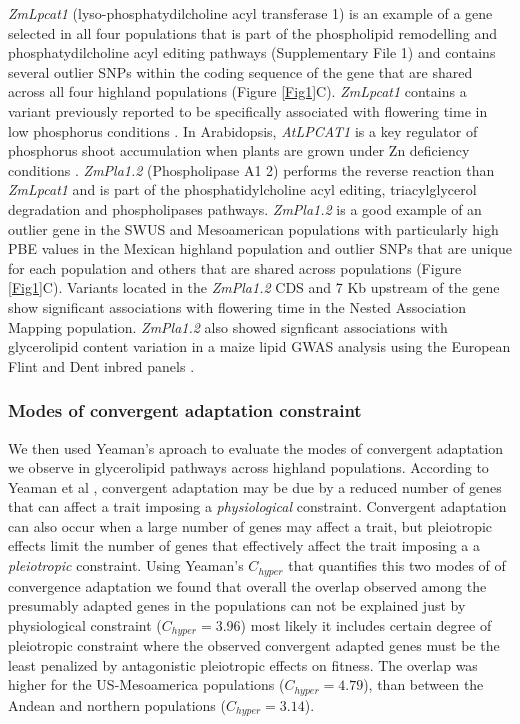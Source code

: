 \documentclass[9pt,twocolumn,twoside,lineno]{gsajnl}
\begin{document}
\textit{ZmLpcat1} (lyso-phosphatydilcholine acyl transferase 1) is an example of a gene selected in all four populations that is part of the phospholipid remodelling and phosphatydilcholine acyl editing pathways (Supplementary File 1) and contains several outlier SNPs within the coding sequence of the gene that are shared across all four highland populations (Figure \ref{Fig1}C). \textit{ZmLpcat1} contains a variant previously reported to be specifically associated with flowering time in low phosphorus conditions \cite{xu2018a}. 
In Arabidopsis, \textit{AtLPCAT1} is a key regulator of phosphorus shoot accumulation when plants are grown under Zn deficiency conditions \cite{Kisko2018-zm}.
\textit{ZmPla1.2} (Phospholipase A1 2) performs the reverse reaction than \textit{ZmLpcat1} and is part of the phosphatidylcholine acyl editing, triacylglycerol degradation and phospholipases pathways. 
\textit{ZmPla1.2} is a good example of an outlier gene in the SWUS and Mesoamerican populations with particularly high PBE values in the Mexican highland population and outlier SNPs that are unique for each population and others that are shared across populations (Figure \ref{Fig1}C). 
Variants located in the \textit{ZmPla1.2} CDS \cite{Chen2012-gg} and 7 Kb upstream  of the gene \cite{Hung2012-ms} show significant associations with flowering time in the Nested Association Mapping population. \textit{ZmPla1.2} also showed signficant associations with glycerolipid content variation in a maize lipid GWAS analysis using the European Flint and Dent inbred panels \cite{Riedelsheimer2013-bd}.

\subsubsection{Modes of convergent adaptation constraint} 
We then used Yeaman's \cite{yeaman2018} aproach to evaluate the modes of convergent adaptation we observe in glycerolipid pathways across highland populations. 
According to Yeaman et al \cite{yeaman2018}, convergent adaptation may be due by a reduced number of genes that can affect a trait imposing a \textit{physiological} constraint. 
Convergent adaptation can also occur when a large number of genes may affect a trait, but pleiotropic effects limit the number of genes that effectively affect the trait imposing a a \textit{pleiotropic} constraint. 
Using Yeaman's \cite{yeaman2018} $C_{hyper}$ that quantifies this two modes of of convergence adaptation we found that overall the overlap observed among the presumably adapted genes in the populations can not be explained just by physiological constraint ($C_{hyper} = 3.96$) most likely it includes certain degree of pleiotropic constraint where the observed convergent adapted genes must be the least penalized by antagonistic pleiotropic effects on fitness.
The overlap was higher for the US-Mesoamerica populations ($C_{hyper} = 4.79$), than between the Andean and northern populations ($C_{hyper} = 3.14$).
\end{document}
